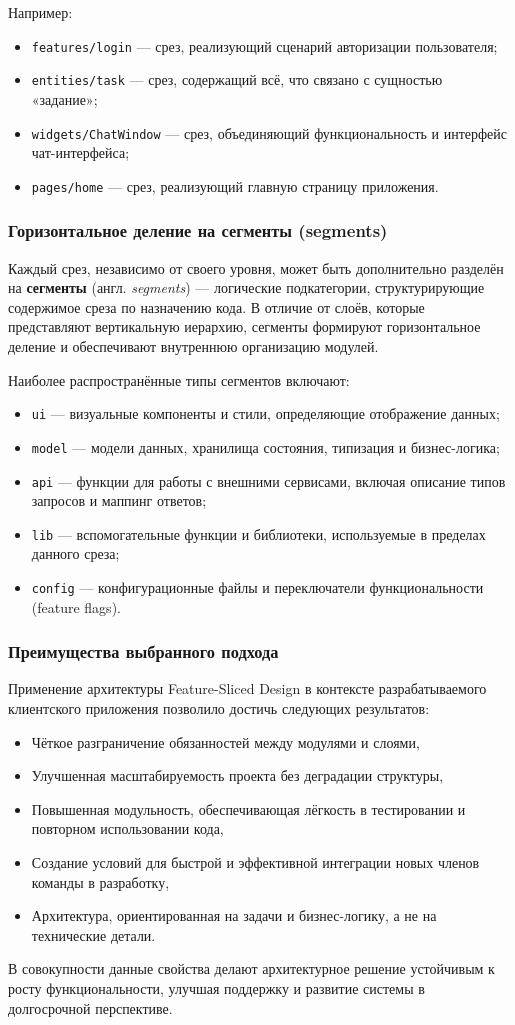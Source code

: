 Например:
\begin{itemize}
  \item \texttt{features/login} — срез, реализующий сценарий авторизации пользователя;
  \item \texttt{entities/task} — срез, содержащий всё, что связано с сущностью «задание»;
  \item \texttt{widgets/ChatWindow} — срез, объединяющий функциональность и интерфейс чат-интерфейса;
  \item \texttt{pages/home} — срез, реализующий главную страницу приложения.
\end{itemize}

\subsubsection{Горизонтальное деление на сегменты (segments)}

Каждый срез, независимо от своего уровня, может быть дополнительно разделён на \textbf{сегменты} (англ. \textit{segments}) — логические подкатегории, структурирующие содержимое среза по назначению кода. В отличие от слоёв, которые представляют вертикальную иерархию, сегменты формируют горизонтальное деление и обеспечивают внутреннюю организацию модулей.

Наиболее распространённые типы сегментов включают:
\begin{itemize}
  \item \texttt{ui} — визуальные компоненты и стили, определяющие отображение данных;
  \item \texttt{model} — модели данных, хранилища состояния, типизация и бизнес-логика;
  \item \texttt{api} — функции для работы с внешними сервисами, включая описание типов запросов и маппинг ответов;
  \item \texttt{lib} — вспомогательные функции и библиотеки, используемые в пределах данного среза;
  \item \texttt{config} — конфигурационные файлы и переключатели функциональности (feature flags).
\end{itemize}

\subsubsection*{Преимущества выбранного подхода}

Применение архитектуры Feature-Sliced Design в контексте разрабатываемого клиентского приложения позволило достичь следующих результатов:
\begin{itemize}
  \item Чёткое разграничение обязанностей между модулями и слоями,
  \item Улучшенная масштабируемость проекта без деградации структуры,
  \item Повышенная модульность, обеспечивающая лёгкость в тестировании и повторном использовании кода,
  \item Создание условий для быстрой и эффективной интеграции новых членов команды в разработку,
  \item Архитектура, ориентированная на задачи и бизнес-логику, а не на технические детали.
\end{itemize}

В совокупности данные свойства делают архитектурное решение устойчивым к росту функциональности, улучшая поддержку и развитие системы в долгосрочной перспективе.